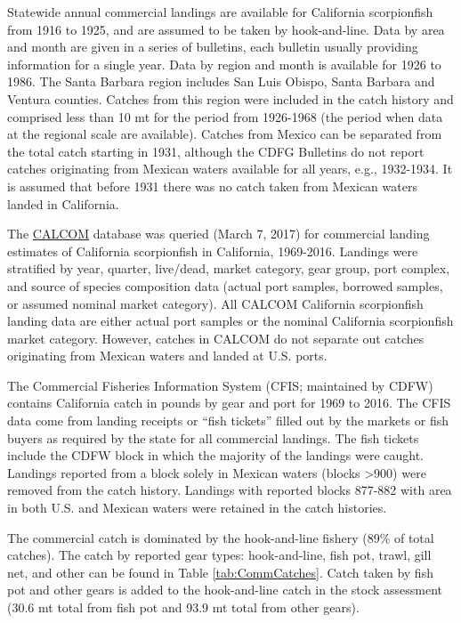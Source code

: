 \documentclass[12pt,]{article}
\begin{document}
Statewide annual commercial landings are available for California
scorpionfish from 1916 to 1925, and are assumed to be taken by
hook-and-line. Data by area and month are given in a series of
bulletins, each bulletin usually providing information for a single
year. Data by region and month is available for 1926 to 1986. The Santa
Barbara region includes San Luis Obispo, Santa Barbara and Ventura
counties. Catches from this region were included in the catch history
and comprised less than 10 mt for the period from 1926-1968 (the period
when data at the regional scale are available). Catches from Mexico can
be separated from the total catch starting in 1931, although the CDFG
Bulletins do not report catches originating from Mexican waters
available for all years, e.g., 1932-1934. It is assumed that before 1931
there was no catch taken from Mexican waters landed in California.

The \href{http://128.114.3.187/}{CALCOM} database was queried (March 7,
2017) for commercial landing estimates of California scorpionfish in
California, 1969-2016. Landings were stratified by year, quarter,
live/dead, market category, gear group, port complex, and source of
species composition data (actual port samples, borrowed samples, or
assumed nominal market category). All CALCOM California scorpionfish
landing data are either actual port samples or the nominal California
scorpionfish market category. However, catches in CALCOM do not separate
out catches originating from Mexican waters and landed at U.S. ports.

The Commercial Fisheries Information System (CFIS; maintained by CDFW)
contains California catch in pounds by gear and port for 1969 to 2016.
The CFIS data come from landing receipts or ``fish tickets'' filled out
by the markets or fish buyers as required by the state for all
commercial landings. The fish tickets include the CDFW block in which
the majority of the landings were caught. Landings reported from a block
solely in Mexican waters (blocks \textgreater{}900) were removed from
the catch history. Landings with reported blocks 877-882 with area in
both U.S. and Mexican waters were retained in the catch histories.

The commercial catch is dominated by the hook-and-line fishery (89\% of
total catches). The catch by reported gear types: hook-and-line, fish
pot, trawl, gill net, and other can be found in Table
\ref{tab:CommCatches}. Catch taken by fish pot and other gears is added
to the hook-and-line catch in the stock assessment (30.6 mt total from
fish pot and 93.9 mt total from other gears).
\end{document}
